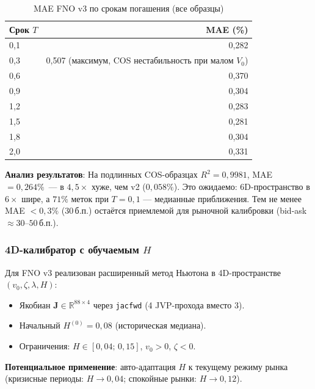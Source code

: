 \begin{table}[H]
\centering
\caption{MAE FNO v3 по срокам погашения (все образцы)}
\label{tab:fno_v3_maturity}
\begin{tabular}{l r}
\toprule
Срок $T$ & MAE (\%) \\
\midrule
0{,}1 & 0{,}282 \\
0{,}3 & 0{,}507 \quad (максимум, COS нестабильность при малом $V_0$) \\
0{,}6 & 0{,}370 \\
0{,}9 & 0{,}304 \\
1{,}2 & 0{,}283 \\
1{,}5 & 0{,}281 \\
1{,}8 & 0{,}304 \\
2{,}0 & 0{,}331 \\
\bottomrule
\end{tabular}
\end{table}

\textbf{Анализ результатов}: На подлинных COS-образцах $R^2 = 0{,}9981$,
MAE $= 0{,}264\%$~--- в $4{,}5\times$ хуже, чем v2 ($0{,}058\%$).
Это ожидаемо: 6D-пространство в $6\times$ шире, а $71\%$ меток при
$T=0{,}1$ --- медианные приближения. Тем не менее MAE $< 0{,}3\%$
($30\,\text{б.п.}$) остаётся приемлемой для рыночной калибровки
(bid-ask $\approx 30$--$50\,\text{б.п.}$).

\subsubsection{4D-калибратор с обучаемым $H$}

Для FNO v3 реализован расширенный метод Ньютона в 4D-пространстве
$(v_0, \zeta, \lambda, H)$:
\begin{itemize}
  \item Якобиан $\mathbf{J} \in \mathbb{R}^{88\times4}$ через \texttt{jacfwd}
        (4 JVP-прохода вместо 3).
  \item Начальный $H^{(0)} = 0{,}08$ (историческая медиана).
  \item Ограничения: $H \in [0{,}04;\,0{,}15]$, $v_0 > 0$, $\zeta < 0$.
\end{itemize}

\textbf{Потенциальное применение}: авто-адаптация $H$ к текущему режиму рынка
(кризисные периоды: $H \to 0{,}04$; спокойные рынки: $H \to 0{,}12$).

